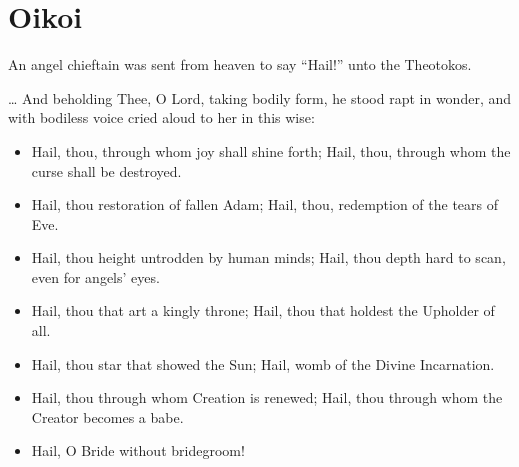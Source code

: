 \documentclass[twoside, letterpaper, 12pt]{report}
\begin{document}
\chapter*{Oikoi}


\begin{priest}
  \item An angel chieftain was sent from heaven to say 
    “Hail!” unto the Theotokos. \thrice{}
  \item … And beholding Thee, O Lord, taking bodily form,
    he stood rapt in wonder,
    and with bodiless voice cried aloud to her in this wise:
\end{priest}

\begin{itemize}[label=\tiny{+},leftmargin=*]
\item Hail, thou, through whom joy shall shine forth;
      Hail, thou, through whom the curse shall be destroyed.
\item Hail, thou restoration of fallen Adam;
      Hail, thou, redemption of the tears of Eve.
\item Hail, thou height untrodden by human minds;
      Hail, thou depth hard to scan, even for angels’ eyes.
\item Hail, thou that art a kingly throne;
      Hail, thou that holdest the Upholder of all.
\item Hail, thou star that showed the Sun;
      Hail, womb of the Divine Incarnation.
\item Hail, thou through whom Creation is renewed;
      Hail, thou through whom the Creator becomes
a babe.
\item Hail, O Bride without bridegroom! 
\end{itemize}



\end{document}
